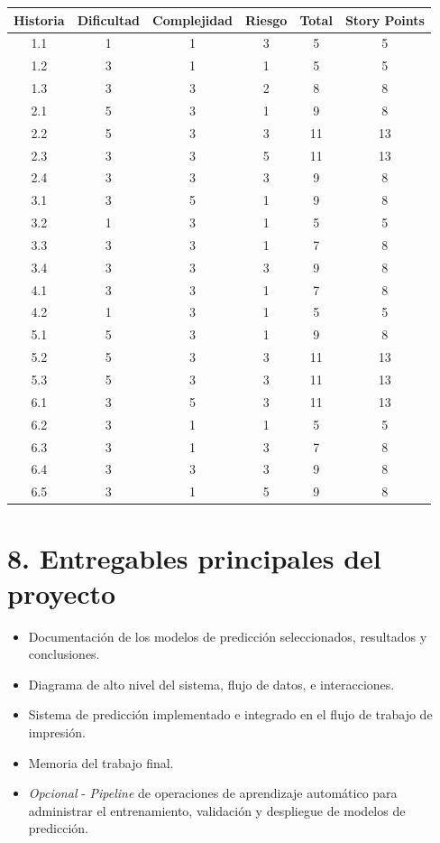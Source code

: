 \documentclass[
11pt, %
]{charter}
\begin{document}
\begin{table}[htpb]
\centering
\begin{tabular}{|c|c|c|c|c|c|}
\hline
\rowcolor[HTML]{C0C0C0}
Historia & Dificultad & Complejidad & Riesgo & Total & Story Points \\ \hline
1.1 & 1 & 1 & 3 & 5 & 5 \\ \hline
1.2 & 3 & 1 & 1 & 5 & 5 \\ \hline
1.3 & 3 & 3 & 2 & 8 & 8 \\ \hline
2.1 & 5 & 3 & 1 & 9 & 8 \\ \hline
2.2 & 5 & 3 & 3 & 11 & 13 \\ \hline
2.3 & 3 & 3 & 5 & 11 & 13 \\ \hline
2.4 & 3 & 3 & 3 & 9 & 8 \\ \hline
3.1 & 3 & 5 & 1 & 9 & 8 \\ \hline
3.2 & 1 & 3 & 1 & 5 & 5 \\ \hline
3.3 & 3 & 3 & 1 & 7 & 8 \\ \hline
3.4 & 3 & 3 & 3 & 9 & 8 \\ \hline
4.1 & 3 & 3 & 1 & 7 & 8 \\ \hline
4.2 & 1 & 3 & 1 & 5 & 5 \\ \hline
5.1 & 5 & 3 & 1 & 9 & 8 \\ \hline
5.2 & 5 & 3 & 3 & 11 & 13 \\ \hline
5.3 & 5 & 3 & 3 & 11 & 13 \\ \hline
6.1 & 3 & 5 & 3 & 11 & 13 \\ \hline
6.2 & 3 & 1 & 1 & 5 & 5 \\ \hline
6.3 & 3 & 1 & 3 & 7 & 8 \\ \hline
6.4 & 3 & 3 & 3 & 9 & 8 \\ \hline
6.5 & 3 & 1 & 5 & 9 & 8 \\ \hline
\end{tabular}
\end{table}


\section{8. Entregables principales del proyecto}
\label{sec:entregables}

\begin{itemize}
	\item Documentación de los modelos de predicción seleccionados, resultados y conclusiones.
	\item Diagrama de alto nivel del sistema, flujo de datos, e interacciones.
	\item Sistema de predicción implementado e integrado en el flujo de trabajo de impresión.
	\item Memoria del trabajo final.
	\item \textit{Opcional} - \textit{Pipeline} de operaciones de aprendizaje automático para administrar el entrenamiento, validación y despliegue de modelos de predicción.
\end{itemize}
\end{document}
